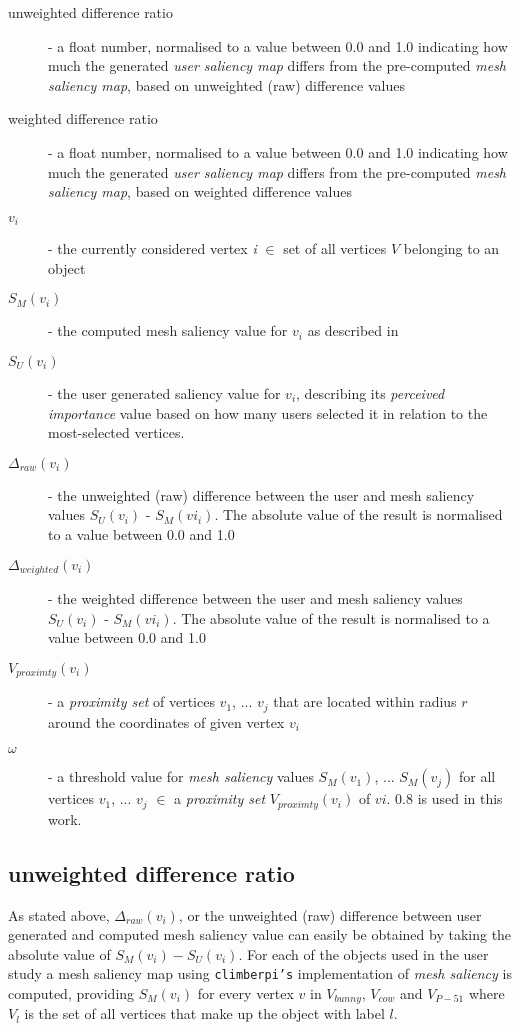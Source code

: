 \begin{description}
	\item[unweighted difference ratio] - a float number, normalised to a value between 0.0 and 1.0 indicating how much the generated \textit{user saliency map} differs from the pre-computed \textit{mesh saliency map}, based on unweighted (raw) difference values
	\item[weighted difference ratio] - a float number, normalised to a value between 0.0 and 1.0 indicating how much the generated \textit{user saliency map} differs from the pre-computed \textit{mesh saliency map}, based on weighted difference values
	\item[$v_i$] - the currently considered vertex \textit{i} $\in$ set of all vertices $V$ belonging to an object
	\item[$S_{M}(v_i)$] - the computed mesh saliency value for $v_i$ as described in \cite{lee2005mesh}
	\item[$S_{U}(v_i)$] - the user generated saliency value for $v_i$, describing its \textit{perceived importance} value based on how many users selected it in relation to the most-selected vertices.
	\item[$\Delta_{raw}(v_i)$] - the unweighted (raw) difference between the user and mesh saliency values $S_{U}(v_i)$ - $S_{M}(vi_i)$. The absolute value of the result is normalised to a value between 0.0 and 1.0
	\item[$\Delta_{weighted}(v_i)$] - the weighted difference between the user and mesh saliency values $S_{U}(v_i)$ - $S_{M}(vi_i)$. The absolute value of the result is normalised to a value between 0.0 and 1.0
	\item[$V_{proximty}(v_i)$] - a \textit{proximity set} of vertices $v_1$, ... $v_j$ that are located within radius $r$ around the coordinates of given vertex $v_i$
	\item[$\omega$] - a threshold value for \textit{mesh saliency} values $S_{M}(v_1)$, ... $S_{M}(v_j)$ for all vertices $v_1$, ... $v_j$ $\in$ a \textit{proximity set} $V_{proximty}(v_i)$ of $vi$. $0.8$ is used in this work.
\end{description}

		\subsection{unweighted difference ratio}
		\label{sec:unweighted_difference_ratio}
As stated above, $\Delta_{raw}(v_i)$, or the unweighted (raw) difference between user generated and computed mesh saliency value can easily be obtained by taking the absolute value of $S_{M}(v_i) - S_{U}(v_i)$. For each of the objects used in the user study a mesh saliency map using \texttt{climberpi's} implementation of \textit{mesh saliency} \cite{clms} is computed, providing $S_{M}(v_i)$ for every vertex $v$ in $V_{bunny}$, $V_{cow}$ and $V_{P-51}$ where $V_{l}$ is the set of all vertices that make up the object with label $l$.

